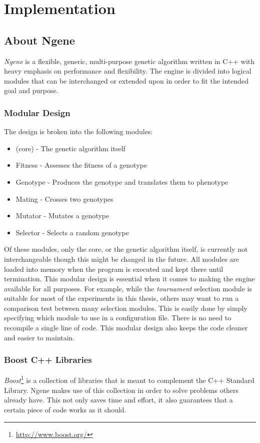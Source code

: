 \section{Implementation}

\subsection{About Ngene}
\emph{Ngene} is a flexible, generic, multi-purpose genetic algorithm written in C++ with heavy emphasis on performance and flexibility. The engine is divided into logical modules that can be interchanged or extended upon in order to fit the intended goal and purpose.

\subsubsection{Modular Design}
The design is broken into the following modules:

\begin{itemize}
	\item (core) - The genetic algorithm itself
	\item Fitness - Assesses the fitness of a genotype
	\item Genotype - Produces the genotype and translates them to phenotype
	\item Mating - Crosses two genotypes
	\item Mutator - Mutates a genotype
	\item Selector - Selects a random genotype
\end{itemize}

Of these modules, only the core, or the genetic algorithm itself, is currently not interchangeable though this might be changed in the future. All modules are loaded into memory when the program is executed and kept there until termination. This modular design is essential when it comes to making the engine available for all purposes. For example, while the \emph{tournament} selection module is suitable for most of the experiments in this thesis, others may want to run a comparison test between many selection modules. This is easily done by simply specifying which module to use in a configuration file. There is no need to recompile a single line of code. This modular design also keeps the code cleaner and easier to maintain.

\subsubsection{Boost C++ Libraries}
\emph{Boost}\footnote{\url{http://www.boost.org/}} is a collection of libraries that is meant to complement the C++ Standard Library. Ngene makes use of this collection in order to solve problems others already have. This not only saves time and effort, it also guarantees that a certain piece of code works as it should.

